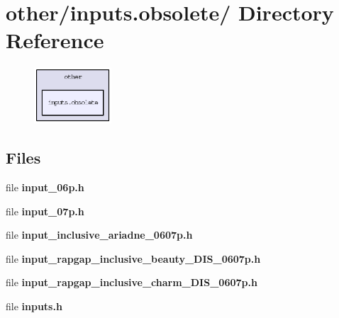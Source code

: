 \section{other/inputs.obsolete/ Directory Reference}
\label{dir_c5f68100aa0711b3cc384ba1b42787af}


\begin{figure}[H]
\begin{center}
\leavevmode
\includegraphics[width=82pt]{dir_c5f68100aa0711b3cc384ba1b42787af_dep}
\end{center}
\end{figure}
\subsection*{Files}
\begin{CompactItemize}
\item 
file \textbf{input\_\-06p.h}
\item 
file \textbf{input\_\-07p.h}
\item 
file \textbf{input\_\-inclusive\_\-ariadne\_\-0607p.h}
\item 
file \textbf{input\_\-rapgap\_\-inclusive\_\-beauty\_\-DIS\_\-0607p.h}
\item 
file \textbf{input\_\-rapgap\_\-inclusive\_\-charm\_\-DIS\_\-0607p.h}
\item 
file \textbf{inputs.h}
\end{CompactItemize}

